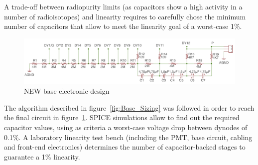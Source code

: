 \documentclass[a4paper, 10pt, oneside, twocolumn, 3p]{elsarticle}
\begin{document}
\par A trade-off between radiopurity limits \cite{1029-8479}  (as capacitors show a high activity in a number of radioisotopes) and linearity requires to carefully chose the minimum number of capacitors that allow to meet the linearity goal of a \mbox{worst-case} 1\%. %

\begin{figure}[ht]
  \begin{center}
   	 \includegraphics[width=\textwidth]{./figures/base_sch.png}    
   	 \caption{NEW base electronic design}
   	 \label{fig:BASE}
  \end{center}
\end{figure}



\par The algorithm described in figure~\ref{fig:Base_Sizing} was followed in order to reach the final circuit in figure~\ref{fig:BASE}. SPICE simulations allow to find out the required capacitor values, using as criteria a worst-case voltage drop between dynodes of 0.1\%. A laboratory linearity test bench (including the PMT, base circuit, cabling and front-end electronics) determines the number of capacitor-backed stages to guarantee a 1\% linearity.
\end{document}
